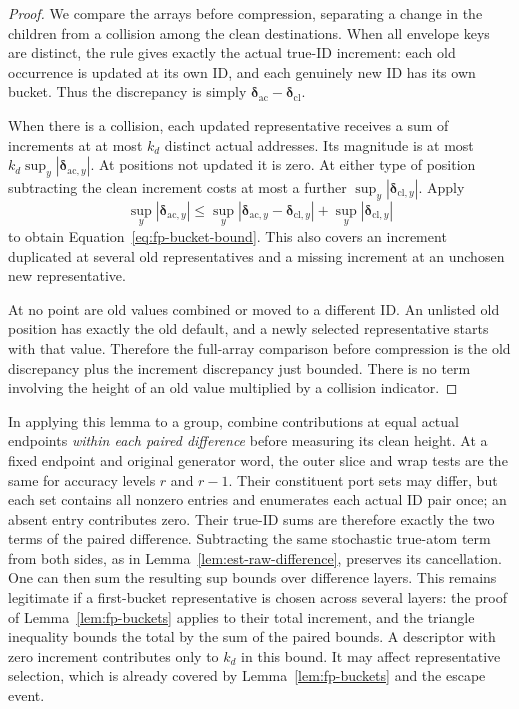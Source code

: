 \documentclass[11pt]{article}
\numberwithin{equation}{section}
\theoremstyle{definition}
\theoremstyle{remark}
\begin{document}
\begin{proof}
We compare the arrays before compression, separating a change in the children from a collision among the clean destinations. When all envelope keys are distinct, the rule gives exactly the actual
true-ID increment: each old occurrence is updated at its own ID, and
each genuinely new ID has its own bucket.  Thus the discrepancy is
simply $\boldsymbol{\delta}_{\mathrm{ac}}-\boldsymbol{\delta}_{\mathrm{cl}}$.

When there is a collision, each updated representative receives a sum
of increments at at most $k_d$ distinct actual addresses.  Its magnitude
is at most $k_d\sup_y|\boldsymbol{\delta}_{\mathrm{ac},y}|$.  At positions not
updated it is zero.  At either type of position subtracting the clean
increment costs at most a further
$\sup_y|\boldsymbol{\delta}_{\mathrm{cl},y}|$.  Apply
\[
 \sup_y|\boldsymbol{\delta}_{\mathrm{ac},y}|
 \le\sup_y|\boldsymbol{\delta}_{\mathrm{ac},y}-\boldsymbol{\delta}_{\mathrm{cl},y}|
      +\sup_y|\boldsymbol{\delta}_{\mathrm{cl},y}|
\]
to obtain Equation~\eqref{eq:fp-bucket-bound}.  This also covers an
increment duplicated at several old representatives and a missing
increment at an unchosen new representative.

At no point are old values combined or moved to a different ID.  An
unlisted old position has exactly the old default, and a newly selected
representative starts with that value.  Therefore the full-array
comparison before compression is the old discrepancy plus the increment
discrepancy just bounded.  There is no term involving the height of an
old value multiplied by a collision indicator.
\end{proof}

In applying this lemma to a group, combine contributions at equal actual
endpoints \emph{within each paired difference} before measuring its
clean height.  At a fixed endpoint and original generator word, the
outer slice and wrap tests are the same for accuracy levels ${r}$ and ${r}-1$.
Their constituent port sets may differ, but each set contains all
nonzero entries and enumerates each actual ID pair once; an absent
entry contributes zero.  Their true-ID sums are therefore exactly the
two terms of the paired difference.  Subtracting the same stochastic
true-atom term from both sides, as in
Lemma~\ref{lem:est-raw-difference}, preserves its cancellation.
One can then sum the resulting sup bounds over difference layers.
This remains legitimate
if a first-bucket representative is chosen across several layers:
the proof of Lemma~\ref{lem:fp-buckets} applies to their total increment,
and the triangle inequality bounds the total by the sum of the paired
bounds.  A descriptor with zero increment contributes only to $k_d$ in
this bound.  It may affect representative selection, which is already
covered by Lemma~\ref{lem:fp-buckets} and the escape event.
\end{document}
